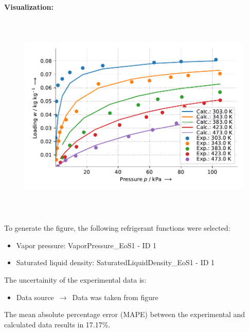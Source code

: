 \textbf{Visualization:}
%
\begin{figure}[!htp]
{\noindent\includegraphics[height=10cm, keepaspectratio]{figs/ads/ads_Propylene_zeolite_pellet_4A_Toth_1.pdf}}
\end{figure}
%

To generate the figure, the following refrigerant functions were selected:
\begin{itemize}
\item Vapor pressure: VaporPressure\_EoS1 - ID 1
\item Saturated liquid density: SaturatedLiquidDensity\_EoS1 - ID 1
\end{itemize}

The uncertainity of the experimental data is:
\begin{itemize}
\item Data source $\,\to\,$ Data was taken from figure
\end{itemize}

The mean absolute percentage error (MAPE) between the experimental and calculated data results in 17.17\%.
\FloatBarrier
\newpage
